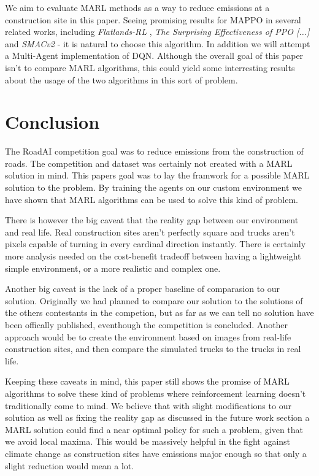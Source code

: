\documentclass[conference]{IEEEtran}
\begin{document}
	We aim to evaluate MARL methods as a way to reduce \coo{} emissions at a construction site in this paper.
	Seeing promising results for MAPPO in several related works, including \textit{Flatlands-RL} \cite{laurent2021flatland},
	\textit{The Surprising Effectiveness of PPO [...]} \cite{yu2022surprising} and \textit{SMACv2} \cite{ellis2022smacv2}-
	it is natural to choose this algorithm. In addition we will attempt a Multi-Agent implementation of DQN. Although the
	overall goal of this paper isn't to compare MARL algorithms, this could yield some interresting results about the
	usage of the two algorithms in this sort of problem.


	\section{Conclusion}

	The RoadAI competition goal was to reduce \coo{} emissions from the construction of roads.
	The competition and dataset was certainly not created with a MARL solution in mind.
	This papers goal was to lay the framwork for a possible MARL solution to the problem.
	By training the agents on our custom environment we have shown that MARL algorithms can be used to solve
	this  kind of problem.

	There is however the big caveat that the reality gap between our environment and real life.
	Real construction sites aren't perfectly square and trucks aren't pixels capable of turning in every
	cardinal direction instantly. There is certainly more analysis needed on the cost-benefit tradeoff
	between having a lightweight simple environment, or a more realistic and complex one.

	Another big caveat is the lack of a proper baseline of comparasion to our solution.
	Originally we had planned to compare our solution to the solutions of the others contestants in the
	competion, but as far as we can tell no solution have been offically published, eventhough the competition
	is concluded. Another approach would be to create the environment based on images from real-life
	construction sites, and then compare the simulated trucks to the trucks in real life.

	Keeping these caveats in mind, this paper still shows the promise of MARL algorithms to solve these kind of
	problems where reinforcement learning doesn't traditionally come to mind. We believe that with slight modifications to our solution as well as fixing the reality gap as discussed in the future work section a MARL solution could find a near optimal policy for such a problem, given that we avoid local maxima. This would be massively helpful in the fight against climate change as construction sites have emissions major enough so that only a slight reduction would mean a lot.
\end{document}
